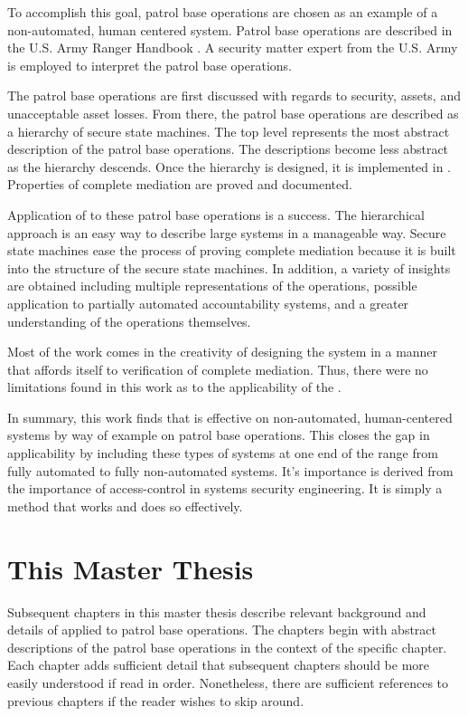 \documentclass[../../main/main.tex]{subfiles}
\begin{document}
To accomplish this goal, patrol base operations are chosen as an example of a non-automated, human centered system.  Patrol base operations are described in the U.S. Army Ranger Handbook \cite{rangermanual}.  A security matter expert from the U.S. Army is employed to interpret the patrol base operations.  

The patrol base operations are first discussed with regards to security, assets, and unacceptable asset losses.  From there, the patrol base operations are described as a hierarchy of secure state machines.  The top level represents the most abstract description of the patrol base operations.  The descriptions become less abstract as the hierarchy descends.  Once the hierarchy is designed, it is implemented in .  Properties of complete mediation are proved and documented.  
 
Application of  to these patrol base operations is a success.   The hierarchical approach is an easy way to describe large systems in a manageable way. Secure state machines ease the process of proving complete mediation because it is built into the structure of the secure state machines.  In addition, a variety of insights are obtained including multiple representations of the operations, possible application to partially automated accountability systems, and a greater understanding of the operations themselves. 

 Most of the work comes in the creativity of designing the system in a manner that affords itself to verification of complete mediation.  Thus, there were no limitations found in this work as to the applicability of the . 


In summary, this work finds that  is effective on non-automated, human-centered systems by way of example on patrol base operations.  This closes the gap in  applicability by including these types of systems at one end of the range from fully automated to fully non-automated systems.  It's importance is derived from the importance of access-control in systems security engineering.  It is simply a method that works and does so effectively.  

\section{This Master Thesis}\label{sec:thismasterthesis}
Subsequent chapters in this master thesis describe relevant background and details of  applied to patrol base operations.  The chapters begin with abstract descriptions of the patrol base operations in the context of the specific chapter.  Each chapter adds sufficient detail that subsequent chapters should be more easily understood if read in order.  Nonetheless, there are sufficient references to previous chapters if the reader wishes to skip around.
\end{document}
